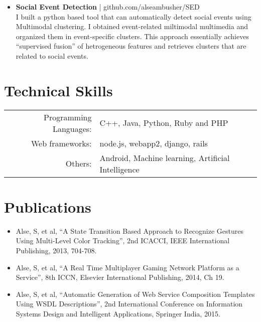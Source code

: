 \documentclass[a4paper]{article} %
\begin{document}
\begin{itemize}
 \item \textbf{Social Event Detection} | github.com/alseambusher/SED\\ 
 I built a python based tool that can automatically detect social events using Multimodal clustering. I obtained event-related miltimodal multimedia and organized them in event-specific clusters. This approach essentially achieves “supervised fusion” of hetrogeneous features and retrieves clusters that are related to social events.
\end{itemize}


\section{Technical Skills}
\renewcommand{\arraystretch}{1}%
\begin{tabular}{rl}

Programming Languages: &  C++, Java, Python, Ruby and PHP\\
Web frameworks: & node.js, webapp2, django, rails\\
Others: & Android, Machine learning, Artificial Intelligence \\
\end{tabular}


\section{Publications}
\begin{itemize}
\item Alse, S, et al, ``A State Transition Based Approach to Recognize Gestures Using Multi-Level Color Tracking'', 2nd ICACCI, IEEE International Publishing, 2013, 704-708.
\item Alse, S, et al, ``A Real Time Multiplayer Gaming Network Platform as a Service'', 8th ICCN, Elsevier International Publishing, 2014, Ch 19.
\item Alse, S, et al, ``Automatic Generation of Web Service Composition Templates Using WSDL Descriptions'', 2nd International Conference on Information Systems Design and Intelligent Applications, Springer India, 2015.
\end{itemize}
\end{document}
